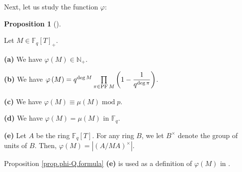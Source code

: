 \documentclass[numbers=enddot,12pt,final,onecolumn,notitlepage]{scrartcl}%
\theoremstyle{definition}
\newtheorem{prop}[theo]{Proposition}
\newenvironment{proposition}[1][]
{\begin{prop}[#1]\begin{leftbar}}
{\end{leftbar}\end{prop}}
\let\prodnonlimits\prod
\renewcommand{\prod}{\prodnonlimits\limits}
\begin{document}
Next, let us study the function $\varphi$:

\begin{proposition}
\label{prop.phi-Q.formula}Let $M\in\mathbb{F}_{q}\left[  T\right]  _{+}$.

\textbf{(a)} We have $\varphi\left(  M\right)  \in\mathbb{N}_{+}$.

\textbf{(b)} We have $\varphi\left(  M\right)  =q^{\deg M}\prod\limits_{\pi
\in\operatorname*{PF}M}\left(  1-\dfrac{1}{q^{\deg\pi}}\right)  $.

\textbf{(c)} We have $\varphi\left(  M\right)  \equiv\mu\left(  M\right)
\operatorname{mod}p$.

\textbf{(d)} We have $\varphi\left(  M\right)  =\mu\left(  M\right)  $ in
$\mathbb{F}_{q}$.

\textbf{(e)} Let $A$ be the ring $\mathbb{F}_{q}\left[  T\right]  $. For any
ring $B$, we let $B^{\times}$ denote the group of units of $B$. Then,
$\varphi\left(  M\right)  =\left\vert \left(  A/MA\right)  ^{\times
}\right\vert $.
\end{proposition}

Proposition \ref{prop.phi-Q.formula} \textbf{(e)} is used as a definition of
$\varphi\left(  M\right)  $ in \cite[\S 6]{kc-carlitz}.
\end{document}

